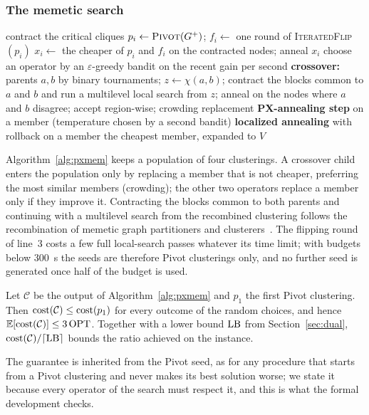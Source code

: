 \subsubsection{The memetic search}

\begin{algorithm}[t]
\caption{PXMem$(G^+,T)$}\label{alg:pxmem}
\begin{algorithmic}[1]
\State contract the critical cliques
  \State $p_i\gets\textsc{Pivot}(G^+)$; $f_i\gets$ one round of \textsc{IteratedFlip}$(p_i)$
  \State $x_i\gets$ the cheaper of $p_i$ and $f_i$ on the contracted nodes; anneal $x_i$
\EndFor
{}
  \State choose an operator by an $\varepsilon$-greedy bandit on the recent gain per second
  \State \textbf{crossover:} parents $a,b$ by binary tournaments; $z\gets\chi(a,b)$;
  \Statex \hspace{\algorithmicindent} contract the blocks common to $a$ and $b$ and run a multilevel local search from $z$;
  \Statex \hspace{\algorithmicindent} anneal on the nodes where $a$ and $b$ disagree; accept region-wise; crowding replacement
  \State \textbf{PX-annealing step} on a member (temperature chosen by a second bandit)
  \State \textbf{localized annealing} with rollback on a member
\EndWhile
\State \Return the cheapest member, expanded to $V$
\end{algorithmic}
\end{algorithm}

Algorithm~\ref{alg:pxmem} keeps a population of four clusterings.  A crossover
child enters the population only by replacing a member that is not cheaper,
preferring the most similar members (crowding); the other two operators
replace a member only if they improve it.  Contracting the blocks common to
both parents and continuing with a multilevel search from the recombined
clustering follows the recombination of memetic graph partitioners and
clusterers~\citep{SandersS12kaffpae,BiedermannHSS18memetic,hausberger2025scc}.  The flipping round of line~3 costs a few
full local-search passes whatever its time limit; with budgets below
\SI{300}{s} the seeds are therefore Pivot clusterings only, and no further seed
is generated once half of the budget is used.

\begin{theorem}\label{thm:pxmem}
Let $\mathcal C$ be the output of Algorithm~\ref{alg:pxmem} and $p_1$ the first
Pivot clustering.  Then $\mathrm{cost}(\mathcal C)\le\mathrm{cost}(p_1)$ for every outcome of
the random choices, and hence $\mathbb E[\mathrm{cost}(\mathcal C)]\le3\,\mathrm{OPT}$.  Together
with a lower bound $\mathrm{LB}$ from Section~\ref{sec:dual},
$\mathrm{cost}(\mathcal C)/\lceil\mathrm{LB}\rceil$ bounds the ratio achieved on the instance.
\end{theorem}
The guarantee is inherited from the Pivot seed, as for any procedure that
starts from a Pivot clustering and never makes its best solution worse; we state
it because every operator of the search must respect it, and this is what the
formal development checks.

